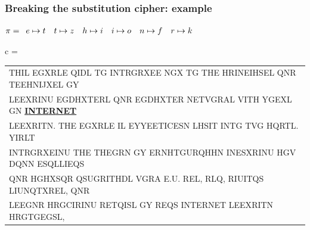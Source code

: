 \documentclass[aspectratio=169, lualatex, 10pt,dvipsnames,svgnames]{beamer} %
\def\enbleu#1{\textcolor{bleu}{#1}}
\def\enrouge#1{\textcolor{rouge}{#1}}
\begin{document}
\begin{frame}
  \frametitle{Breaking the substitution cipher: example}
  
    \enrouge{
    \tiny{$\pi=
      \begin{array}[t]{l}
            e\mapsto t\quad t\mapsto z \quad h\mapsto i\quad i\mapsto o\quad n\mapsto f\quad r\mapsto k
      \end{array}
      $}}
  \vspace{0.25cm}

  \color{vert}
  \tiny{c =
    \begin{tabular}[t]{l}
      \enbleu{T}\enbleu{H}\enbleu{I}L EGX\enbleu{R}L\enbleu{E} Q\enbleu{I}DL \enbleu{T}G \enbleu{I}\enbleu{N}\enbleu{T}\enbleu{R}GRXE\enbleu{E} NGX \enbleu{T}G \enbleu{T}\enbleu{H}\enbleu{E} H\enbleu{R}\enbleu{I}\enbleu{N}E\enbleu{I}HS\enbleu{E}L Q\enbleu{N}R \enbleu{T}\enbleu{E}E\enbleu{H}\enbleu{N}\enbleu{I}JX\enbleu{E}L GY \\
      L\enbleu{E}EX\enbleu{R}\enbleu{I}\enbleu{N}U EGDHX\enbleu{T}\enbleu{E}\enbleu{R}L Q\enbleu{N}R EGDHX\enbleu{T}\enbleu{E}\enbleu{R} \enbleu{N}\enbleu{E}\enbleu{T}VG\enbleu{R}AL V\enbleu{I}\enbleu{T}\enbleu{H} YGEXL G\enbleu{N} \underline{\bf \enbleu{I}\enbleu{N}\enbleu{T}\enbleu{E}\enbleu{R}\enbleu{N}\enbleu{E}\enbleu{T}} \\
      L\enbleu{E}EX\enbleu{R}\enbleu{I}\enbleu{T}N. \enbleu{T}\enbleu{H}\enbleu{E} EGX\enbleu{R}L\enbleu{E} \enbleu{I}L \enbleu{E}YY\enbleu{E}E\enbleu{T}\enbleu{I}C\enbleu{E}SN LHS\enbleu{I}\enbleu{T} \enbleu{I}\enbleu{N}\enbleu{T}G \enbleu{T}VG HQ\enbleu{R}\enbleu{T}L. Y\enbleu{I}\enbleu{R}L\enbleu{T} \\
      \enbleu{I}\enbleu{N}\enbleu{T}\enbleu{R}GRXE\enbleu{I}\enbleu{N}U \enbleu{T}\enbleu{H}\enbleu{E} \enbleu{T}\enbleu{H}\enbleu{E}G\enbleu{R}N GY E\enbleu{R}NH\enbleu{T}GU\enbleu{R}QH\enbleu{H}N \enbleu{I}\enbleu{N}ESXR\enbleu{I}\enbleu{N}U \enbleu{H}GV DQ\enbleu{N}N ESQLL\enbleu{I}EQS \\
      Q\enbleu{N}R HGHXSQ\enbleu{R} QSUG\enbleu{R}\enbleu{I}\enbleu{T}\enbleu{H}DL VG\enbleu{R}A \enbleu{E}.U. R\enbleu{E}L, \enbleu{R}LQ, R\enbleu{I}U\enbleu{I}\enbleu{T}QS L\enbleu{I}U\enbleu{N}Q\enbleu{T}X\enbleu{R}\enbleu{E}L, Q\enbleu{N}R \\
      L\enbleu{E}EG\enbleu{N}R H\enbleu{R}GC\enbleu{I}R\enbleu{I}\enbleu{N}U R\enbleu{E}\enbleu{T}Q\enbleu{I}SL GY \enbleu{R}\enbleu{E}QS \enbleu{I}\enbleu{N}\enbleu{T}\enbleu{E}\enbleu{R}\enbleu{N}\enbleu{E}\enbleu{T} L\enbleu{E}EX\enbleu{R}\enbleu{I}\enbleu{T}N H\enbleu{R}G\enbleu{T}GEGSL, \\

\end{tabular}}
\end{frame}
\end{document}
